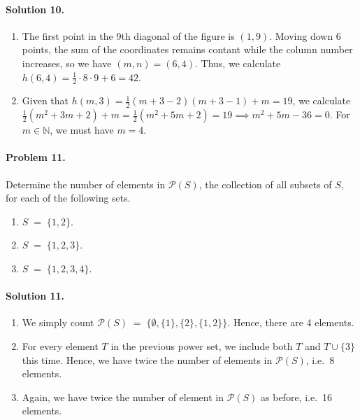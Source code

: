 \documentclass[10pt]{article}
\begin{document}
        \paragraph{Solution 10.}
        \begin{enumerate}
                \item The first point in the 9th diagonal of the figure is $(1, 9)$. Moving down 6 points, the sum of the coordinates remains
                contant while the column number increases, so we have $(m, n) = (6, 4)$. Thus, we calculate
                $h(6, 4) = \frac{1}{2}\cdot 8 \cdot 9 + 6 = 42$.

                \item Given that $h(m, 3) = \frac{1}{2}(m + 3 - 2)(m + 3 - 1) + m = 19$, we calculate
                $\frac{1}{2}(m^2 + 3m + 2) + m = \frac{1}{2}(m^2 + 5m + 2) = 19 \implies m^2 + 5m - 36 = 0$.
                For $m \in \mathbb{N}$, we must have $m = 4$.
        \end{enumerate}
         
        \paragraph{Problem 11.} Determine the number of elements in $\mathcal{P}(S)$, the collection of all subsets of $S$, for each of the
        following sets.
        \begin{enumerate}
                \item $S \;=\; \{1, 2\}$.
                \item $S \;=\; \{1, 2, 3\}$.
                \item $S \;=\; \{1, 2, 3, 4\}$.
        \end{enumerate}
        \paragraph{Solution 11.}
        \begin{enumerate}
                \item We simply count $\mathcal{P}(S) \;=\; \{\emptyset, \{1\}, \{2\}, \{1, 2\}\}$. Hence,
                there are 4 elements.
                \item For every element $T$ in the previous power set, we include both $T$ and $T \cup \{3\}$ this time.
                Hence, we have twice the number of elements in $\mathcal{P}(S)$, i.e.\ 8 elements.
                \item Again, we have twice the number of element in $\mathcal{P}(S)$ as before, i.e.\ 16 elements.
        \end{enumerate}
\end{document}
